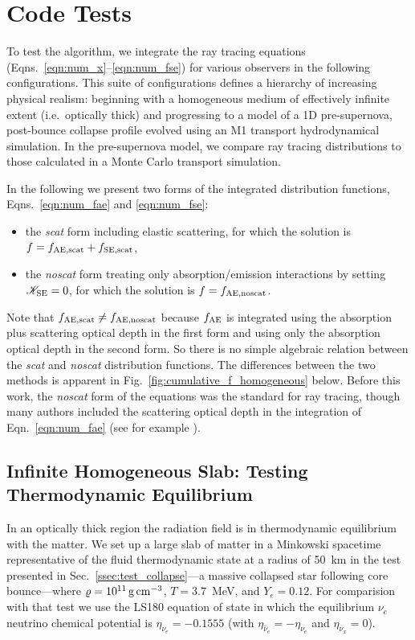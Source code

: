 \documentclass[aps,floatfix,prd,superscriptaddress,twocolumn]{revtex4-1}
\begin{document}
\section{Code Tests}
\label{sec:tests}

To test the algorithm, we integrate the ray tracing equations
(Eqns.~\ref{eqn:num_x}--\ref{eqn:num_fse}) for various observers
in the following configurations. This suite of configurations
defines a hierarchy of increasing physical realism:
beginning with a homogeneous medium of effectively
infinite extent (i.e.\ optically thick) and progressing to a model of a
1D pre-supernova, post-bounce collapse profile
evolved using an M1 transport hydrodynamical simulation.
In the pre-supernova model, we compare ray tracing distributions
to those calculated in a Monte Carlo transport simulation.

In the following we present two forms of the integrated distribution functions,
Eqns.~\ref{eqn:num_fae} and \ref{eqn:num_fse}:
\begin{itemize}
\item the \emph{scat} form including elastic scattering,
  for which the solution is
  $f=f_{\rm AE,scat}+f_{\rm SE,scat}$,
\item the \emph{noscat} form treating only absorption/emission interactions
  by setting $\mathscr{K}_{\rm SE}=0$,
  for which the solution is
  $f=f_{\rm AE,noscat}$.
\end{itemize}
Note that $f_{\rm AE,scat} \neq f_{\rm AE,noscat}$ because $f_{\rm AE}$
is integrated using the absorption plus scattering optical depth in
the first form and using only the absorption optical depth in the second form.
So there is no simple algebraic relation between the \emph{scat} and
\emph{noscat} distribution functions.
The differences between the two methods is apparent
in Fig.~\ref{fig:cumulative_f_homogeneous} below.
Before this work, the \emph{noscat} form of the equations was the standard
for ray tracing, though many authors included the scattering optical depth in
the integration of Eqn.~\ref{eqn:num_fae}
(see for example \cite{hari2010-gr_nunubar_collapsar}).

\subsection{Infinite Homogeneous Slab:
  Testing Thermodynamic Equilibrium}
\label{ssec:test_equilibrium}
In an optically thick region the radiation field is in thermodynamic equilibrium
with the matter.
We set up a large slab of matter in a Minkowski spacetime
representative of the fluid thermodynamic state at a radius of 50~km
in the test presented in Sec.~\ref{ssec:test_collapse}---a
massive collapsed star following core bounce---where
$\varrho=10^{11}\,{\rm g}\,{\rm cm}^{-3}$, $T=3.7$~MeV, and $Y_e=0.12$.
For comparision with that test we use the LS180 equation of state
\cite{latt1991-nuc_eos, ocon2010-gr1d}
in which the equilibrium $\nu_e$ neutrino chemical potential is
$\eta_{\nu_e}=-0.1555$
(with $\eta_{\bar{\nu}_e}=-\eta_{\nu_e}$ and $\eta_{\nu_x}=0$).
\end{document}
